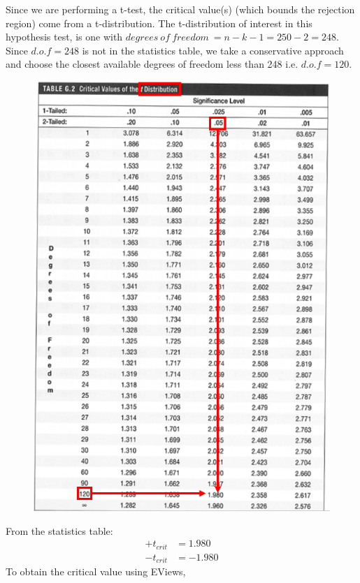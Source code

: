 \documentclass[12pt]{report}
\begin{document}
\noindent Since we are performing a t-test, the critical value(s) (which bounds the rejection region) come from a t-distribution. The t-distribution of interest in this hypothesis test, is one with $degrees\ of\ freedom\ = n - k - 1 = 250 - 2 = 248$. Since $d.o.f = 248$ is not in the statistics table, we take a conservative approach and choose the closest available degrees of freedom less than 248 i.e. $d.o.f=120$. 
\begin{figure}[H]
	\centering
	\includegraphics{tute6_q2_1}
\end{figure}
\vspace{-\baselineskip}
\noindent From the statistics table: \begin{align*}
	+t_{crit} &= 1.980 \\
	-t_{crit} &= -1.980
\end{align*}
\noindent To obtain the critical value using EViews,
\end{document}
